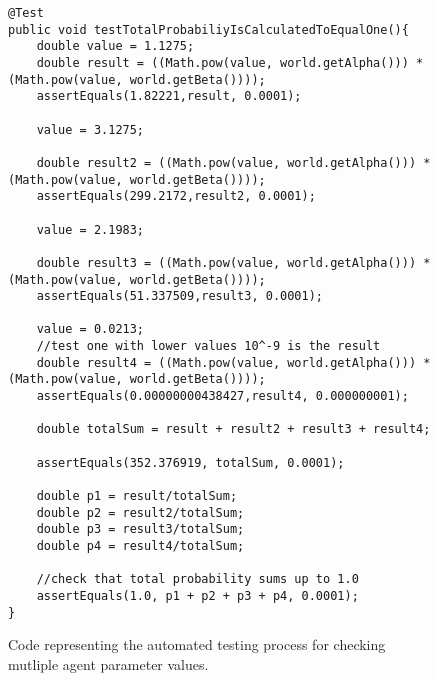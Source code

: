 \begin{figure}[H]
\begin{lstlisting}
@Test
public void testTotalProbabiliyIsCalculatedToEqualOne(){
	double value = 1.1275;
	double result = ((Math.pow(value, world.getAlpha())) * (Math.pow(value, world.getBeta())));
	assertEquals(1.82221,result, 0.0001);

	value = 3.1275;

	double result2 = ((Math.pow(value, world.getAlpha())) * (Math.pow(value, world.getBeta())));
	assertEquals(299.2172,result2, 0.0001);

	value = 2.1983;

	double result3 = ((Math.pow(value, world.getAlpha())) * (Math.pow(value, world.getBeta())));
	assertEquals(51.337509,result3, 0.0001);

	value = 0.0213;
	//test one with lower values 10^-9 is the result
	double result4 = ((Math.pow(value, world.getAlpha())) * (Math.pow(value, world.getBeta())));
	assertEquals(0.00000000438427,result4, 0.000000001);

	double totalSum = result + result2 + result3 + result4;

	assertEquals(352.376919, totalSum, 0.0001);

	double p1 = result/totalSum;
	double p2 = result2/totalSum;
	double p3 = result3/totalSum;
	double p4 = result4/totalSum;

	//check that total probability sums up to 1.0
	assertEquals(1.0, p1 + p2 + p3 + p4, 0.0001);
}
\end{lstlisting}
\caption{Code representing the automated testing process for checking mutliple agent parameter values.}
\label{testProb}
\end{figure}


